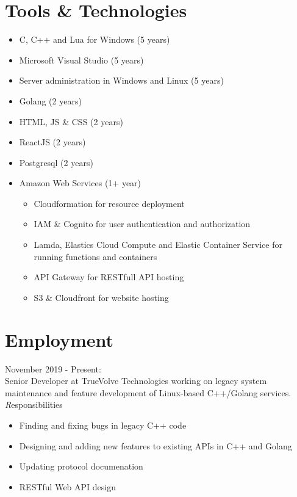 \documentclass[11pt,a4paper]{article}
\begin{document}
\section*{Tools \& Technologies}
\begin{itemize}
	\item C, C++ and Lua for Windows (5 years)
	\item Microsoft Visual Studio (5 years)
	\item Server administration in Windows and Linux (5 years)
	\item Golang (2 years)
	\item HTML, JS \& CSS (2 years)
	\item ReactJS (2 years)
	\item Postgresql (2 years)
	\item Amazon Web Services (1+ year)
	\begin{itemize}
		\item Cloudformation for resource deployment
		\item IAM \& Cognito for user authentication and authorization
		\item Lamda, Elastics Cloud Compute and Elastic Container Service for running functions and containers 
		\item API Gateway for RESTfull API hosting
		\item S3 \& Cloudfront for website hosting
	\end{itemize}
\end{itemize}

\section*{Employment}

{\noindent\large November 2019 - Present:}\\

Senior Developer at TrueVolve Technologies working on legacy system maintenance and feature development of Linux-based C++/Golang services.
\\

	{\emph Responsibilities}
	\begin{itemize}
	\item Finding and fixing bugs in legacy C++ code
	\item Designing and adding new features to existing APIs in C++ and Golang
	\item Updating protocol documenation
	\item RESTful Web API design
	\end{itemize}
	
\end{document}
